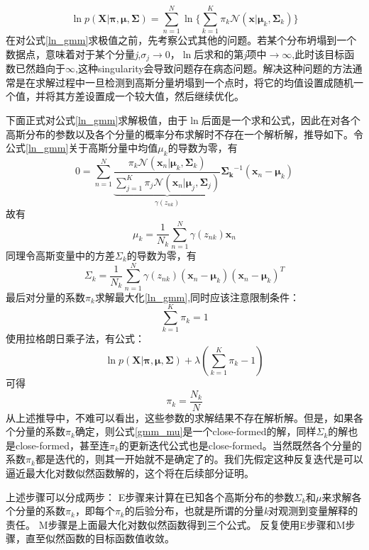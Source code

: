 \documentclass{article}
\begin{document}
\begin{CJK*}{UTF8}{gbsn}
\begin{equation} \label{ln_gmm}
    \ln p(\boldsymbol{X}|\boldsymbol{\pi}, \boldsymbol{\mu}, \boldsymbol{\Sigma}) = \sum_{n=1}^{N} \ln \big\{ \sum_{k=1}^{K}\pi_k\mathcal{N}(\textbf{x}|\boldsymbol{\mu}_k,\boldsymbol{\Sigma}_k)
    \big\}
\end{equation}
在对公式\ref{ln_gmm}求极值之前，先考察公式其他的问题。若某个分布坍塌到一个数据点，意味着对于某个分量\textit{j},${\sigma}_j\to 0$，$\ln$后求和的第\textit{j}项中$\to \infty$,此时该目标函数已然趋向于$\infty$,这种singularity会导致问题存在病态问题。解决这种问题的方法通常是在求解过程中一旦检测到高斯分量坍塌到一个点时，将它的均值设置成随机一个值，并将其方差设置成一个较大值，然后继续优化。\par
下面正式对公式\ref{ln_gmm}求解极值，由于$\ln$后面是一个求和公式，因此在对各个高斯分布的参数以及各个分量的概率分布求解时不存在一个解析解，推导如下。令公式\ref{ln_gmm}关于高斯分量中均值${\mu}_k$的导数为零，有
\begin{equation} \label{gmm_mu}
    0 = \sum_{n=1}^{N}  
    \underbrace { 
    \frac{\pi_k\mathcal{N}(\boldsymbol{x}_n|\boldsymbol{\mu}_k, \boldsymbol{\Sigma}_k)} {\sum_{j=1}^{K}\pi_j\mathcal{N}(\boldsymbol{x}_n|\boldsymbol{\mu}_j, \boldsymbol{\Sigma}_j)} 
    }_{\gamma(z_{nk})}
    \boldsymbol{\Sigma_k}^{-1}(\boldsymbol{x}_n-\boldsymbol{\mu}_k)
\end{equation}
故有
\begin{equation}
    {\mu}_k = \frac{1}{N_k} \sum_{n=1}^{N} \gamma(z_{nk})\boldsymbol{x}_n
\end{equation}
同理令高斯变量中的方差$\Sigma_k$的导数为零，有
\begin{equation}
    \Sigma_k = \frac{1}{N_k} \sum_{n=1}^{N} \gamma(z_{nk})(\boldsymbol{x}_n- \boldsymbol{\mu}_k) (\boldsymbol{x}_n- \boldsymbol{\mu}_k)^{T}
\end{equation}
最后对分量的系数$\pi_k$求解最大化\ref{ln_gmm},同时应该注意限制条件：
\begin{equation}
    \sum_{k=1}^{K}\pi_k = 1
\end{equation}
使用拉格朗日乘子法，有公式：
\begin{equation}
    \ln p(\boldsymbol{X}|\boldsymbol{\pi}, \boldsymbol{\mu}, \boldsymbol{\Sigma}) + \lambda (\sum_{k=1}^{K}\pi_k - 1)
\end{equation}
可得
\begin{equation}
    \pi_k = \frac{N_k}{N}
\end{equation}
从上述推导中，不难可以看出，这些参数的求解结果不存在解析解。但是，如果各个分量的系数$\pi_k$确定，则公式\ref{gmm_mu}是一个close-formed的解，同样$\Sigma_k$的解也是close-formed，甚至连$\pi_k$的更新迭代公式也是close-formed。当然既然各个分量的系数$\pi_k$都是迭代的，则其一开始就不是确定了的。我们先假定这种反复迭代是可以逼近最大化对数似然函数解的，这个将在后续部分证明。
\par
上述步骤可以分成两步：
E步骤来计算在已知各个高斯分布的参数$\Sigma_k$和$\mu$来求解各个分量的系数$\pi_k$，即每个$\pi_k$的后验分布，也就是所谓的分量\textit{k}对观测到变量解释的责任。
M步骤是上面最大化对数似然函数得到三个公式。
反复使用E步骤和M步骤，直至似然函数的目标函数值收敛。


\end{CJK*}
\end{document}
